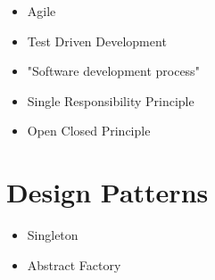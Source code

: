 \begin{itemize}
	\item Agile
	\item Test Driven Development
	\item "Software development process"
	\item Single Responsibility Principle
	\item Open Closed Principle
\end{itemize}


\toclineskip
\section{Design Patterns}

\begin{itemize}
	\item Singleton
	\item Abstract Factory
\end{itemize}


